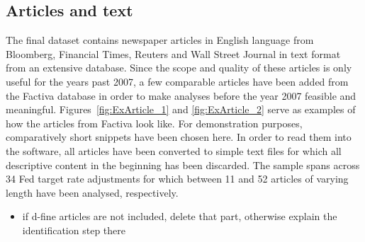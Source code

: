 \subsection{Articles and text}
The final dataset contains newspaper articles in English language from Bloomberg, Financial Times, Reuters and Wall Street Journal in text format from an extensive database. Since the scope and quality of these articles is only useful for the years past 2007, a few comparable articles have been added from the Factiva database in order to make analyses before the year 2007 feasible and meaningful. Figures~\vref{fig:ExArticle_1} and \vref{fig:ExArticle_2} serve as examples of how the articles from Factiva look like. For demonstration purposes, comparatively short snippets have been chosen here. In order to read them into the software, all articles have been converted to simple text files for which all descriptive content in the beginning has been discarded. The sample spans across 34 Fed target rate adjustments for which between 11 and 52 articles of varying length have been analysed, respectively.
%
\begin{itemize}
	\item  if d-fine articles are not included, delete that part, otherwise explain the identification step there
\end{itemize}
%